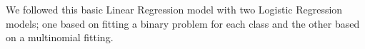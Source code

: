 \documentclass{article}[12pt]
\numberwithin{equation}{subsection}
\begin{document}
\begin{flushleft}
We followed this basic Linear Regression model with two Logistic Regression models; one based on fitting a binary problem for each class and the other based on a multinomial fitting.  






























































\end{flushleft}
\end{document}
